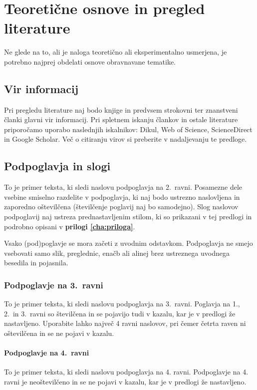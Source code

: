 \chapter{Teoretične osnove in pregled literature}\label{cha:teorija}
Ne glede na to, ali je naloga teoretično ali eksperimentalno usmerjena, je potrebno najprej obdelati osnove obravnavane tematike. 

\section{Vir informacij}\label{sec:viri}
Pri pregledu literature naj bodo knjige in predvsem strokovni ter znanstveni članki glavni vir informacij. Pri spletnem iskanju člankov in ostale literature priporočamo uporabo naslednjih iskalnikov: Dikul, Web of Science, ScienceDirect in Google Scholar. Več o citiranju virov si preberite v nadaljevanju te predloge.

\section{Podpoglavja in slogi}\label{sec:podpoglavja}
To je primer teksta, ki sledi naslovu podpoglavja na 2.~ravni. Posamezne dele vsebine smiselno razdelite v podpoglavja, ki naj bodo ustrezno naslovljena in zaporedno oštevilčena (številčenje poglavij naj bo samodejno). Slog naslovov podpoglavij naj ustreza prednastavljenim stilom, ki so prikazani v tej predlogi in podrobno opisani v \textbf{prilogi \ref{cha:priloga}}. 

Vsako (pod)poglavje se mora začeti z uvodnim odstavkom. Podpoglavja ne smejo vsebovati samo slik, preglednic, enačb ali alinej brez ustreznega uvodnega besedila in pojasnila.

\subsection{Podpoglavje na 3.~ravni}\label{sec_podpoglavje_3}
To je primer teksta, ki sledi naslovu podpoglavja na 3.~ravni. Poglavja na 1., 2.~in 3.~ravni so številčena in se pojavijo tudi v kazalu, kar je v predlogi že nastavljeno. Uporabite lahko največ 4 ravni naslovov, pri čemer četrta raven ni oštevilčena in se ne pojavi v kazalu.

\subsubsection{Podpoglavje na 4.~ravni}
To je primer teksta, ki sledi naslovu podpoglavja na 4. ravni. Podpoglavje na 4. ravni je neoštevilčeno in se ne pojavi v kazalu, kar je v predlogi že nastavljeno.


